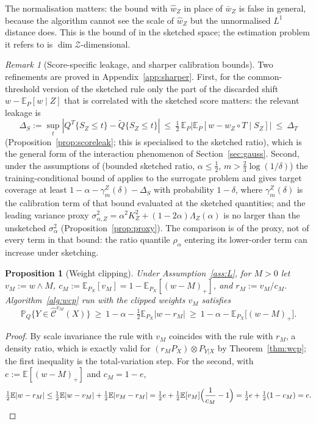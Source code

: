 \documentclass[11pt,a4paper]{article}
\newcommand{\PX}{P_X}
\newcommand{\abs}[1]{\left|#1\right|}
\newcommand{\E}{\mathbb{E}}
\newcommand{\Prob}{\mathbb{P}}
\newcommand{\Cset}{\widehat{\mathcal C}}
\newcommand{\Zc}{\mathcal Z}
\newcommand{\Qt}{\widetilde Q}
\theoremstyle{plain}
\newtheorem{proposition}[theorem]{Proposition}
\theoremstyle{definition}
\theoremstyle{remark}
\newtheorem{remark}[theorem]{Remark}
\begin{document}
The normalisation matters: the bound with $\hat w_Z$ in place of $\bar w_Z$ is false in general, because the algorithm cannot see the scale of $\hat w_Z$ but the unnormalised $L^1$ distance does. This is the bound of \cite[Thm.\ 3]{lei2021} in the sketched space; the estimation problem it refers to is $\dim\Zc$-dimensional.
\begin{remark}[Score-specific leakage, and sharper calibration bounds]\label{rem:pournaderi}
Two refinements are proved in Appendix~\ref{app:sharper}. First, for the common-threshold version of the sketched rule only the part of the discarded shift $w-\E_P[w\mid Z]$ that is correlated with the sketched score matters: the relevant leakage is
\[
\Delta_S:=\sup_t\abs{Q^T\{S_Z\le t\}-\Qt\{S_Z\le t\}}\ \le\ \tfrac12\,\E_P\abs{\E_P[w-w_Z\circ T\mid S_Z]}\ \le\ \Delta_T
\]
(Proposition~\ref{prop:scoreleak}; this is \cite[eq.\ (15)]{pournaderi2026} specialised to the sketched ratio), which is the general form of the interaction phenomenon of Section~\ref{sec:gauss}. Second, under the assumptions of \cite{pournaderi2026} (bounded sketched ratio, $\alpha\le\tfrac12$, $m>\tfrac23\log(1/\delta)$) the training-conditional bound of \cite{pournaderi2026} applies to the surrogate problem and gives target coverage at least $1-\alpha-\gamma^Z_m(\delta)-\Delta_S$ with probability $1-\delta$, where $\gamma^Z_m(\delta)$ is the calibration term of that bound evaluated at the sketched quantities; and the leading variance proxy $\sigma^2_{\alpha,Z}=\alpha^2K_Z^2+(1-2\alpha)\Lambda_Z(\alpha)$ is no larger than the unsketched $\sigma^2_\alpha$ (Proposition~\ref{prop:proxy}). The comparison is of the proxy, not of every term in that bound: the ratio quantile $\rho_\alpha$ entering its lower-order term can increase under sketching.
\end{remark}

\begin{proposition}[Weight clipping]\label{prop:clip}
Under Assumption~\ref{ass:L}, for $M>0$ let $v_M:=w\wedge M$, $c_M:=\E_{\PX}[v_M]=1-\E_{\PX}[(w-M)_+]$, and $r_M:=v_M/c_M$. Algorithm~\ref{alg:wcp} run with the clipped weights $v_M$ satisfies
\[
\Prob_Q\{Y\in\Cset^{v_M}(X)\}\ \ge\ 1-\alpha-\tfrac12\E_{\PX}\abs{w-r_M}\ \ge\ 1-\alpha-\E_{\PX}\bigl[(w-M)_+\bigr].
\]
\end{proposition}
\begin{proof}
By scale invariance the rule with $v_M$ coincides with the rule with $r_M$, a density ratio, which is exactly valid for $(r_M\PX)\otimes P_{Y|X}$ by Theorem~\ref{thm:wcp}; the first inequality is the total-variation step. For the second, with $e:=\E[(w-M)_+]$ and $c_M=1-e$,
\[
\tfrac12\E|w-r_M|\le\tfrac12\E|w-v_M|+\tfrac12\E|v_M-r_M|=\tfrac12e+\tfrac12\E[v_M]\Bigl(\frac1{c_M}-1\Bigr)=\tfrac12e+\tfrac12(1-c_M)=e.
\]
\end{proof}
\end{document}
